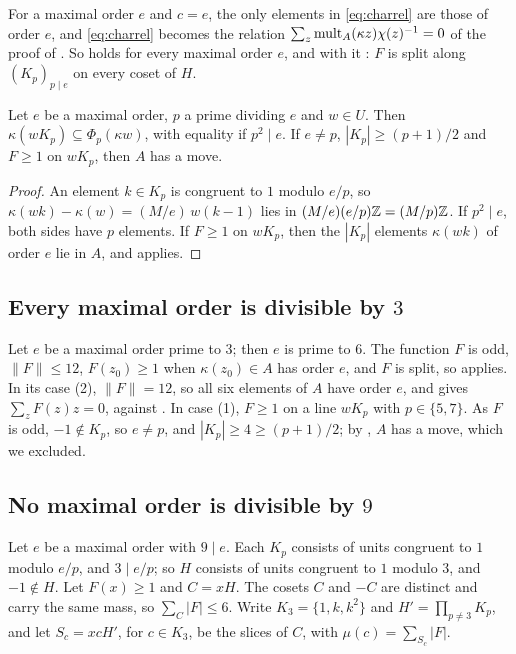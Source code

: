 For a maximal order $e$ and $c=e$, the only elements in \eqref{eq:charrel}
are those of order $e$, and \eqref{eq:charrel} becomes the relation
$\sum_{z}\operatorname{mult}_{A}(\kappa z)\chi(z)^{-1}=0$ of the proof of
. So  holds for every maximal order
$e$, and with it : $F$ is split along $(K_{p})_{p\mid e}$ on
every coset of $H$.

\begin{lemma}\label{lem:fiberline}
Let $e$ be a maximal order, $p$ a prime dividing $e$ and $w\in U$. Then
$\kappa(wK_{p})\subseteq\Phi_{p}(\kappa w)$, with equality if $p^{2}\mid e$.
If $e\ne p$, $|K_{p}|\ge(p+1)/2$ and $F\ge1$ on $wK_{p}$, then $A$ has a
move.
\end{lemma}

\begin{proof}
An element $k\in K_{p}$ is congruent to $1$ modulo $e/p$, so
$\kappa(wk)-\kappa(w)=(M/e)\,w(k-1)$ lies in $(M/e)(e/p)\mathbb{Z}=(M/p)\mathbb{Z}$. If
$p^{2}\mid e$, both sides have $p$ elements. If $F\ge1$ on $wK_{p}$, then the
$|K_{p}|$ elements $\kappa(wk)$ of order $e$ lie in $A$, and
 applies.
\end{proof}

\subsection{Every maximal order is divisible by \texorpdfstring{$3$}{3}}
Let $e$ be a maximal order prime to $3$; then $e$ is prime to $6$. The
function $F$ is odd, $\|F\|\le12$, $F(z_{0})\ge1$ when $\kappa(z_{0})\in A$
has order $e$, and $F$ is split, so  applies. In its case
(2), $\|F\|=12$, so all six elements of $A$ have order $e$, and
 gives $\sum_{z}F(z)z=0$, against . In
case (1), $F\ge1$ on a line $wK_{p}$ with $p\in\{5,7\}$. As $F$ is odd,
$-1\notin K_{p}$, so $e\ne p$, and $|K_{p}|\ge4\ge(p+1)/2$; by
, $A$ has a move, which we excluded.

\subsection{No maximal order is divisible by \texorpdfstring{$9$}{9}}
Let $e$ be a maximal order with $9\mid e$. Each $K_{p}$ consists of units
congruent to $1$ modulo $e/p$, and $3\mid e/p$; so $H$ consists of units
congruent to $1$ modulo $3$, and $-1\notin H$. Let $F(x)\ge1$ and $C=xH$.
The cosets $C$ and $-C$ are distinct and carry the same mass, so
$\sum_{C}|F|\le6$. Write $K_{3}=\{1,k,k^{2}\}$ and $H'=\prod_{p\ne3}K_{p}$,
and let $S_{c}=xcH'$, for $c\in K_{3}$, be the slices of $C$, with
$\mu(c)=\sum_{S_{c}}|F|$.

